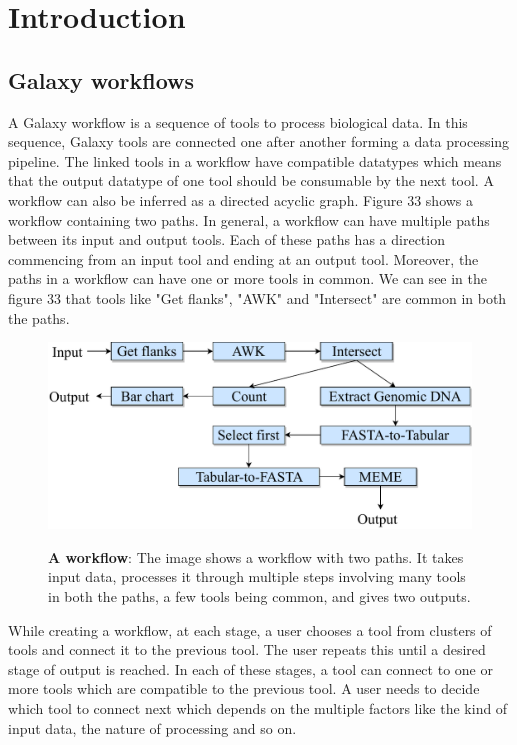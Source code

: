 \chapter{Introduction}\label{chap:introduction}
\section{Galaxy workflows}
A Galaxy workflow is a sequence of tools to process biological data. In this sequence, Galaxy tools are connected one after another forming a data processing pipeline. The linked tools in a workflow have compatible datatypes which means that the output datatype of one tool should be consumable by the next tool. A workflow can also be inferred as a directed acyclic graph. Figure 33 shows a workflow containing two paths. In general, a workflow can have multiple paths between its input and output tools. Each of these paths has a direction commencing from an input tool and ending at an output tool. Moreover, the paths in a workflow can have one or more tools in common. We can see in the figure 33 that tools like "Get flanks", "AWK" and "Intersect" are common in both the paths.

\begin{figure}[h]
\begin{centering}
    {\includegraphics[scale=0.7]{figures/simple_wf_45cee2961bc05b20.pdf}}
    \caption[A workflow]{\textbf{A workflow}: The image shows a workflow with two paths. It takes input data, processes it through multiple steps involving many tools in both the paths, a few tools being common, and gives two outputs.}
\end{centering}
\end{figure}

While creating a workflow, at each stage, a user chooses a tool from clusters of tools and connect it to the previous tool. The user repeats this until a desired stage of output is reached. In each of these stages, a tool can connect to one or more tools which are compatible to the previous tool. A user needs to decide which tool to connect next which depends on the multiple factors like the kind of input data, the nature of processing and so on.